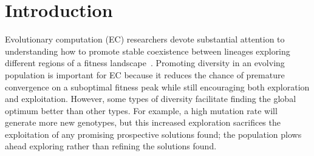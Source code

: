 \section{Introduction}

Evolutionary computation (EC) researchers devote substantial attention to understanding how to promote stable coexistence between lineages %
exploring different regions of a fitness landscape~\cite{goldberg_genetic_1987,mahfoud_niching_1995, mouret_using_2009,pugh_confronting_2015}. %
Promoting diversity in an evolving population is important for EC because it reduces the chance of premature convergence on a suboptimal fitness peak while still encouraging both exploration and exploitation. However, some types of diversity facilitate finding the global optimum better than other types. For example, a high mutation rate will generate more new genotypes, but this increased exploration sacrifices the exploitation of any promising prospective solutions found; the population plows ahead exploring rather than refining the solutions found.

